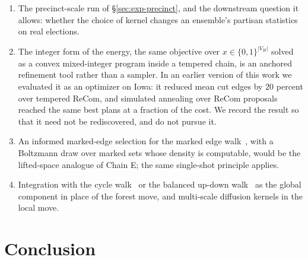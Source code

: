 \documentclass[11pt]{article}
\begin{document}
\begin{enumerate}
  \item The precinct-scale run of \S\ref{sec:exp-precinct}, and the
    downstream question it allows: whether the choice of kernel
    changes an ensemble's partisan statistics on real elections.
  \item The integer form of the energy, the same objective over
    $x \in \{0,1\}^{|V_H|}$ solved as a convex mixed-integer program
    inside a tempered chain, is an anchored refinement tool rather
    than a sampler. In an earlier version of this work we evaluated
    it as an optimizer on Iowa: it reduced mean cut edges by $20$
    percent over tempered ReCom, and simulated annealing over ReCom
    proposals reached the same best plans at a fraction of the cost.
    We record the result so that it need not be rediscovered, and do
    not pursue it.
  \item An informed marked-edge selection for the marked edge
    walk~\cite{mcwhorter2025marked}, with a Boltzmann draw over
    marked sets whose density is computable, would be the lifted-space
    analogue of Chain E; the same single-shot principle applies.
  \item Integration with the cycle walk~\cite{deford2025cycle} or the
    balanced up-down walk~\cite{akitaya2026bud} as the global
    component in place of the forest move, and multi-scale diffusion
    kernels in the local move.
\end{enumerate}

\section{Conclusion}\label{sec:conclusion}
\end{document}
